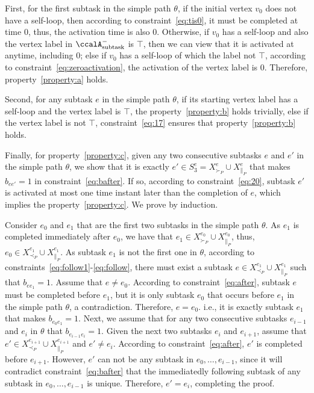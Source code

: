 \documentclass[Afour,sageh,times]{sagej}
\newcommand{\auto}[1]{\ccalA_{\textup{#1}}}
\begin{document}
{{First, for the first subtask in the simple path $\theta$, if the initial vertex $v_0$ does not have a self-loop, then according to constraint~\eqref{eq:tis0}, it must be completed at time 0, thus, the activation time is also 0. Otherwise, if $v_0$ has a self-loop and also the vertex label in $\auto{subtask}^-$ is $\top$, then we can view that it is activated at anytime, including 0; else if $v_0$ has a self-loop of which the  label  not $\top$, according to constraint~\eqref{eq:zeroactivation}, the activation of the vertex label is 0. Therefore, property~\ref{property:a} holds.

Second, for any subtask $e$ in the simple path $\theta$, if its starting vertex label has a self-loop and the vertex label is $\top$, the property~\ref{property:b} holds trivially, else if the vertex label is not $\top$,  constraint~\eqref{eq:17} ensures that  property~\ref{property:b} holds.

Finally,  for  property~\ref{property:c}, given any two consecutive subtasks $e$ and $e'$ in the simple path $\theta$, we show that it is exactly $e' \in S_3^e = X^e_{\succ_{P}} \cup X^e_{\|_{P}}$ that makes $b_{ee'}=1$ in constraint~\eqref{eq:bafter}. If so, according to constraint~\eqref{eq:20}, subtask $e'$ is activated at most one time instant later than the completion of $e$, which implies the property~\ref{property:c}. We prove by induction.

Consider $e_0$ and $e_1$ that are the first two subtasks in the simple path $\theta$. As $e_1$ is completed immediately after $e_0$, we have that $e_1\in X^{e_0}_{\succ_{P}} \cup X^{e_0}_{\|_{P}} $, thus, ${e_0} \in X^{e_1}_{\prec_{P}} \cup X^{e_1}_{\|_{P}}$. As subtask $e_1$ is not the first one in $\theta$, according to constraints~\eqref{eq:follow1}-\eqref{eq:follow}, there must exist  a subtask $e \in X^{e_1}_{\prec_{P}} \cup X^{e_1}_{\|_{P}} $ such that $b_{e e_1}=1$. Assume that $e \neq e_0$. According to constraint~\eqref{eq:after}, subtask $e$ must be completed before $e_1$, but it is only subtask $e_0$ that occurs before $e_1$ in the simple path $\theta$, a contradiction. Therefore, $e  = e_0$. i.e., it is exactly subtask $e_1$ that makes $b_{e_0 e_1}=1$. Next, we assume that for any two consecutive subtasks $e_{i-1}$ and $e_{i}$ in $\theta$ that $b_{e_{i-1} e_i} = 1$. Given the next two subtasks $e_{i}$ and $e_{i+1}$, assume that $e' \in X^{e_{i+1}}_{\prec_{P}} \cup X^{e_{i+1}}_{\|_{P}}$ and $e' \neq e_i$. According to constraint~\eqref{eq:after}, $e'$ is completed before $e_{i+1}$. However, $e'$ can not be any subtask in $e_0, \ldots, e_{i-1}$, since it will contradict constraint~\eqref{eq:bafter} that the immediatedly following subtask of any subtask in $e_0, \ldots, e_{i-1}$ is unique. Therefore, $e' = e_i$, completing the proof.




}}
\end{document}
